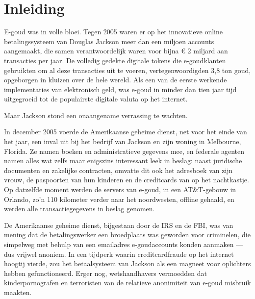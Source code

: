 \documentclass[smalldemyvopaper,11pt,twoside,onecolumn,openright,extrafontsizes,hidelinks]{memoir}
\begin{document}
\normalfont
\pagestyle{empty}
\tableofcontents*
\thispagestyle{empty}
\pagestyle{mystyle}


\mainmatter


\chapter*{Inleiding}\label{inleiding}


E-goud was in volle bloei. Tegen 2005 waren er op het innovatieve online
betalingssysteem van Douglas Jackson meer dan een miljoen accounts
aangemaakt, die samen verantwoordelijk waren voor bijna € 2 miljard aan
transacties per jaar. De volledig gedekte digitale tokens die
e-goudklanten gebruikten om al deze transacties uit te voeren,
vertegenwoordigden 3,8 ton goud, opgeborgen in kluizen over de hele
wereld. Als een van de eerste werkende implementaties van elektronisch
geld, was e-goud in minder dan tien jaar tijd uitgegroeid tot de
populairste digitale valuta op het internet.

Maar Jackson stond een onaangename verrassing te wachten.

In december 2005 voerde de Amerikaanse geheime dienst, net voor het
einde van het jaar, een inval uit bij het bedrijf van Jackson en zijn
woning in Melbourne, Florida. Ze namen boeken en administratieve
gegevens mee, en federale agenten namen alles wat zelfs maar enigszins
interessant leek in beslag: naast juridische documenten en zakelijke
contracten, omvatte dit ook het adresboek van zijn vrouw, de paspoorten
van hun kinderen en de creditcards van op het nachtkastje. Op datzelfde
moment werden de servers van e-goud, in een AT\&T-gebouw in Orlando,
zo'n 110 kilometer verder naar het noordwesten, offline gehaald, en
werden alle transactiegegevens in beslag genomen.

De Amerikaanse geheime dienst, bijgestaan door de IRS en de FBI, was van
mening dat de betalingswerker een broedplaats was geworden voor
criminelen, die simpelweg met behulp van een emailadres e-goudaccounts
konden aanmaken --- dus vrijwel anoniem. In een tijdperk waarin
creditcardfraude op het internet hoogtij vierde, zou het betaalsysteem
van Jackson als een magneet voor oplichters hebben gefunctioneerd. Erger
nog, wetshandhavers vermoedden dat kinderpornografen en terroristen van
de relatieve anonimiteit van e-goud misbruik maakten.
\end{document}
